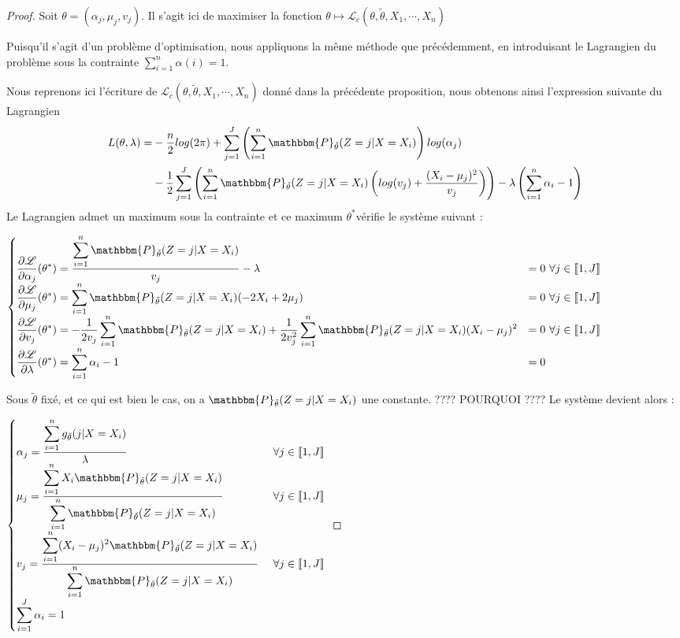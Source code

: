 \documentclass[frenchb]{report}
\newcommand{\1}{\mathbbm{1}}
\newcommand{\prob}{\mathbbm{P}}
\newcommand{\lv}{\mathcal{L}}
\newcommand{\thetat}{\tilde{\theta}}
\theoremstyle{definition}\newtheorem{defn}{Définition}
\theoremstyle{definition}\newtheorem{exm}{Exemple}
\theoremstyle{definition}\newtheorem{nota}{Notation}
\theoremstyle{definition}\newtheorem{rem}{Remarque}
\begin{document}
\begin{proof}
Soit $\theta = (\alpha_j, \mu_j, v_j)$. Il s'agit ici de maximiser la fonction $\theta \mapsto \lv_{c}(\theta,\thetat, X_1, \cdots, X_n)$

Puisqu'il s'agit d'un problème d'optimisation, nous appliquons la même méthode que précédemment, en introduisant le Lagrangien du problème sous la contrainte $\displaystyle\sum_{i=1}^n\alpha(i) = 1$.

Nous reprenons ici l'écriture de $\lv_c(\theta,\thetat,X_1, \cdots, X_n)$ donné dans la précédente proposition, nous obtenons ainsi l'expression suivante du Lagrangien
\begin{align*}
L(\theta,\lambda) = &-\frac{n}{2}log(2\pi)+\sum_{j=1}^J \left(\sum_{i = 1}^n  \prob_{\thetat}(Z=j|X=X_i)\right) log(\alpha_j)\\
&-\frac{1}{2}\sum_{j=1}^J\left(\sum_{i=1}^n \prob_{\thetat}(Z=j|X=X_i)\left(log(v_j)+\frac{(X_i-\mu_j)^2}{v_j}\right)\right) - \lambda\left(\sum_{i=1}^n\alpha_i-1\right)
\end{align*}
Le Lagrangien admet un maximum sous la contrainte et ce maximum $\theta^*$vérifie le système suivant :

$
\begin{cases}
\displaystyle\frac{\partial \lv}{\partial \alpha_j} (\theta^*) = \frac{\displaystyle\sum_{i=1}^n \prob_{\thetat}(Z=j|X=X_i)}{v_j} - \lambda &=0 \text{ } \forall j \in \llbracket 1,J \rrbracket \\
\displaystyle\frac{\partial \lv}{\partial \mu_j} (\theta^*) = \displaystyle\sum_{i=1}^n \prob_{\thetat}(Z=j|X=X_i)(-2X_i+2\mu_j) &=0 \text{ } \forall j \in \llbracket 1,J \rrbracket \\
\displaystyle\frac{\partial \lv}{\partial v_j} (\theta^*) = -\displaystyle\frac{1}{2v_j}\sum_{i=1}^n \prob_{\thetat}(Z=j|X=X_i) + \frac{1}{2v_j^2}\sum_{i=1}^n \prob_{\thetat}(Z=j|X=X_i)(X_i-\mu_j)^2 &=0 \text{ } \forall j \in \llbracket 1,J \rrbracket \\
\displaystyle\frac{\partial \lv}{\partial \lambda} (\theta^*) = \sum_{i=1}^n\alpha_i-1 &=0 
\end{cases}
$

Sous $\thetat$ fixé, et ce qui est bien le cas, on a $\prob_{\thetat}(Z=j|X=X_i)$ une constante.  {\color{red}???? POURQUOI ????}
Le système devient alors :

$
\begin{cases}
\alpha_j =\displaystyle \frac{\displaystyle\sum_{i=1}^n g_{\thetat}(j|X=X_i)}{\lambda} &\text{ } \forall j \in \llbracket 1,J \rrbracket \\
\mu_j =\displaystyle \frac{\displaystyle\sum_{i=1}^n X_i\prob_{\thetat}(Z=j|X=X_i)}{\displaystyle\sum_{i=1}^n \prob_{\thetat}(Z=j|X=X_i)} &\text{ } \forall j \in \llbracket 1,J \rrbracket \\
v_j = \displaystyle\frac{\displaystyle\sum_{i=1}^n (X_i -\mu_j)^2 \prob_{\thetat}(Z=j|X=X_i)}{\displaystyle\displaystyle\sum_{i=1}^n\prob_{\thetat}(Z=j|X=X_i)} &\text{ } \forall j \in \llbracket 1,J \rrbracket \\
\displaystyle\sum_{i=1}^J\alpha_i =1 
\end{cases}
$


\end{proof}
\end{document}
